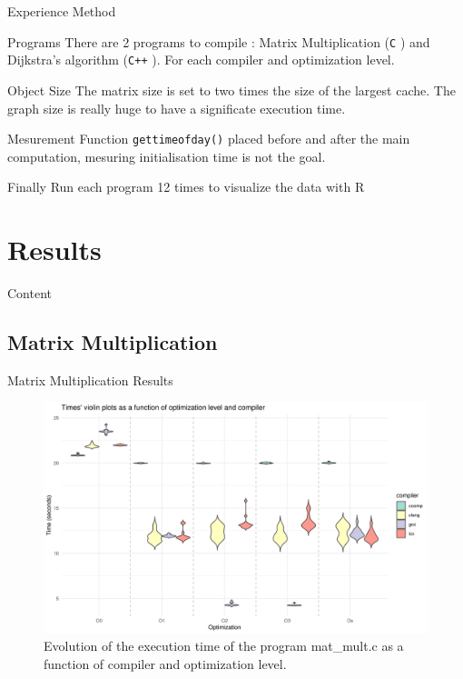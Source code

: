 \documentclass{beamer}
\newcommand{\clgg}{\texttt{C} }
\newcommand{\cpp}{\texttt{C++} }
\begin{document}
    \begin{frame}{Experience Method}
        \begin{block}{Programs}
            There are 2 programs to compile : Matrix Multiplication (\clgg) and Dijkstra's algorithm (\cpp). For each compiler and optimization level.
        \end{block}
        \begin{block}{Object Size}
            The matrix size is set to two times the size of the largest cache. \newline
            The graph size is really huge to have a significate execution time.
        \end{block}
        \begin{block}{Mesurement}
            Function \texttt{gettimeofday()} placed before and after the main computation, mesuring initialisation time is not the goal.
        \end{block}
        \begin{block}{Finally}
            Run each program 12 times to visualize the data with R
        \end{block}
            
    \end{frame}
    
    \section{Results}
    \begin{frame}[noframenumbering]{Content}
        \tableofcontents[currentsection]
    \end{frame}
    
    \subsection{Matrix Multiplication}
    \begin{frame}{Matrix Multiplication Results}
        \begin{figure}[H]
        \centering
        \includegraphics[width=1\textwidth]{img/plots/violin_plot_mat_mult.png}
        \caption{Evolution of the execution time of the program mat\_mult.c as a function of compiler and optimization level.}
        \label{fig:image1}
        \end{figure}
    \end{frame}
    
\end{document}

